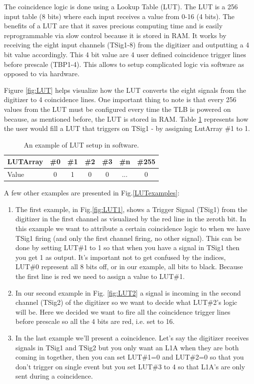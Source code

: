 The coincidence logic is done using a Lookup Table (LUT). The LUT is a 256 input table (8 bits) where each input receives a value from 0-16 (4 bits). The benefits of a LUT are that it saves precious computing time and is easily reprogrammable via slow control because it is stored in RAM. It works by receiving the eight input channels (TSig1-8) from the digitizer and outputting a 4 bit value accordingly. This 4 bit value are 4 user defined coincidence trigger lines before prescale (TBP1-4). This allows to setup complicated logic via software as opposed to via hardware.

Figure \ref{fig:LUT} helps visualize how the LUT converts the eight signals from the digitizer to 4 coincidence lines. One important thing to note is that every 256 values from the LUT must be configured every time the TLB is powered on because, as mentioned before, the LUT is stored in RAM. Table \ref{table:LUTtable} represents how the user would fill a LUT that triggers on TSig1 - by assigning LutArray \#1 to 1.

\begin{table}[htbp!] 
\caption{An example of LUT setup in software.}
\centering
\label{table:LUTtable}
\begin{tabular}{l c c c c c c}
\toprule
LUTArray & \#0 & \#1 & \#2 & \#3 & \#n & \#255 \\
\midrule
Value & 0 & 1 & 0  & 0 & ... & 0 \\
\bottomrule
\end{tabular}
\end{table}

A few other examples are presented in Fig.\ref{LUTexamples}:
\begin{enumerate}[label=(\alph*)]
\item The first example, in Fig.\ref{fig:LUT1}, shows a Trigger Signal (TSig1) from the digitizer in the first channel as visualized by the red line in the zeroth bit. In this example we want to attribute a certain coincidence logic to when we have TSig1 firing (and only the first channel firing, no other signal). This can be done by setting LUT\#1 to 1 so that when you have a signal in TSig1 then you get 1 as output. It's important not to get confused by the indices, LUT\#0 represent all 8 bits off, or in our example, all bits to black. Because the first line is red we need to assign a value to LUT\#1.
\item In our second example in Fig. \ref{fig:LUT2} a signal is incoming in the second channel (TSig2) of the digitizer so we want to decide what LUT\#2's logic will be. Here we decided we want to fire all the coincidence trigger lines before prescale so all the 4 bits are red, i.e. set to 16.
\item In the last example we'll present a coincidence. Let's say the digitizer receives signals in TSig1 and TSig2 but you only want an L1A when they are both coming in together, then you can set LUT\#1=0 and LUT\#2=0 so that you don't trigger on single event but you set LUT\#3 to 4 so that L1A's are only sent during a coincidence.
\end{enumerate}

